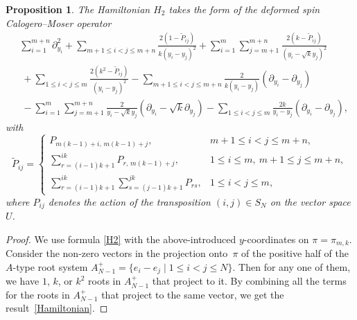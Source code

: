 \documentclass[12pt]{amsart}
\numberwithin{equation}{section}
\newtheorem{prop}[theorem]{Proposition}
\theoremstyle{definition}
\begin{document}
\begin{prop}\label{rat A prop}
The Hamiltonian $H_2$ takes the form of the deformed spin Calogero--Moser operator
\begin{align}
    &\sum\limits_{i = 1}^{m + n} \partial_{y_i}^2 + 
    \sum\limits_{m + 1 \leq i < j \leq m+n} \frac{2(1 - \widetilde{P}_{ij})}{k(y_i - y_j)^2} + 
    \sum\limits_{i = 1}^m \sum\limits_{j = m + 1}^{m + n}
     \frac{2(k - \widetilde{P}_{ij})}{(y_i - \sqrt{k}y_j)^2}  \label{Hamiltonian}
   \\ 
    &\ + \sum\limits_{1 \leq i < j \leq m} \frac{2(k^2 - \widetilde{P}_{i j})}{(y_{i} - y_{j})^2} - 
    \sum\limits_{m+1 \leq i < j \leq m+n}\frac{2}{k(y_i - y_j)} (\partial_{y_i} - \partial_{y_j}) \nonumber 
    \\ 
    &\ - \sum\limits_{i = 1}^m \sum\limits_{j = m + 1}^{m + n} \frac{2}{y_i - \sqrt{k} y_j} 
    (\partial_{y_{i}} - \sqrt{k}\partial_{y_j}) 
    - \sum\limits_{1 \leq i < j \leq m} \frac{2k}{y_{i} - y_{j}} (\partial_{y_{i}} - 
    \partial_{y_{j}}), \nonumber
\end{align}
with
\begin{equation}
\label{perm}
    \widetilde{P}_{ij} = 
    \begin{cases}
        P_{m(k-1)+i, \, m(k-1)+j}, & m + 1 \leq i < j \leq m + n, \\
        \sum\limits_{r = (i - 1)k +1}^{i k}P_{r, \, m(k-1)+j}, & 1 \leq i \leq m, \ m + 1 \leq j \leq m + n, \\
        \sum\limits_{r = (i - 1)k +1}^{i k}\sum\limits_{s = (j - 1)k +1}^{j k} P_{r s}, & 1 \leq i < j \leq m,
    \end{cases}
\end{equation}
where $P_{ij}$ denotes the action of the transposition $(i,j) \in S_N$ on the vector space $U$.
\end{prop}
\begin{proof}
We use formula \eqref{H2} with the above-introduced $y$-coordinates on $\pi = \pi_{m,k}$. 
Consider the non-zero vectors in the projection onto~$\pi$ of the positive half of the $A$-type root system $A_{N-1}^+ = \{e_i - e_j \mid 1 \leq i < j \leq N \}$. Then for any one of them, we have $1$, $k$, or $k^2$ roots in $A_{N-1}^+$ that project to it. By combining all the terms for the roots in $A_{N-1}^+$ that project to the same vector, we get the result~\eqref{Hamiltonian}. 
\end{proof}
\end{document}

